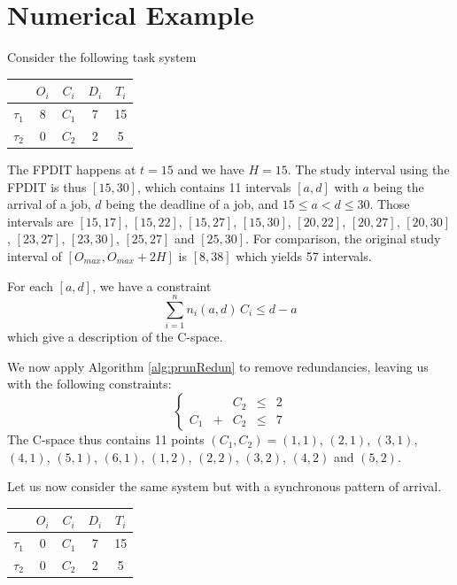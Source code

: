 \documentclass[conference]{IEEEtran}
\begin{document}
\section{Numerical Example}

Consider the following task system

    \begin{center}
    \begin{tabular}{|r|c|c|c|c|}
     \hline
      & $O_i$ & $C_i$ & $D_i$ & $T_i$ \\
     \hline
     $\tau_1$ & 8 & $C_1$ & 7 & 15\\
     \hline
     $\tau_2$ & 0 & $C_2$ & 2 & 5\\
     \hline
    \end{tabular}
    \end{center}

The FPDIT happens at $t=15$ and we have $H = 15$. The study interval using the FPDIT is thus $[15, 30]$, which contains 11 intervals $[a,d]$ with $a$ being the arrival of a job, $d$ being the deadline of a job, and $15 \leqslant a < d \leqslant 30$. Those intervals are
$[15, 17]$, $[15, 22]$, $[15, 27]$, $[15, 30]$, $[20, 22]$, $[20, 27]$, $[20, 30]$, $[23, 27]$, $[23, 30]$, $[25, 27]$ and $[25, 30]$. For comparison, the original study interval of $[O_{max}, O_{max} + 2H]$ is $[8, 38]$ which yields 57 intervals.

For each $[a, d]$, we have a constraint $$\sum_{i=1}^{n} n_i(a, d) \, C_i \leqslant d - a$$ which give a description of the C-space.

We now apply Algorithm \ref{alg:prunRedun} to remove redundancies, leaving us with the following constraints:
	\begin{equation}
		\left\{
			\begin{array}{ccccc}
				& & C_2 & \leqslant & 2 \\
				C_1 & + & C_2 & \leqslant & 7
			\end{array}
		\right.
	\end{equation}
The C-space thus contains 11 points $(C_1, C_2) = (1, 1)$, $(2, 1)$, $(3, 1)$, $(4, 1)$, $(5, 1)$, $(6, 1)$, $(1, 2)$, $(2, 2)$, $(3, 2)$, $(4, 2)$ and $(5, 2)$.

Let us now consider the same system but with a synchronous pattern of arrival.

    \begin{center}
    \begin{tabular}{|r|c|c|c|c|}
     \hline
      & $O_i$ & $C_i$ & $D_i$ & $T_i$ \\
     \hline
     $\tau_1$ & 0 & $C_1$ & 7 & 15\\
     \hline
     $\tau_2$ & 0 & $C_2$ & 2 & 5\\
     \hline
    \end{tabular}
    \end{center}
\end{document}
